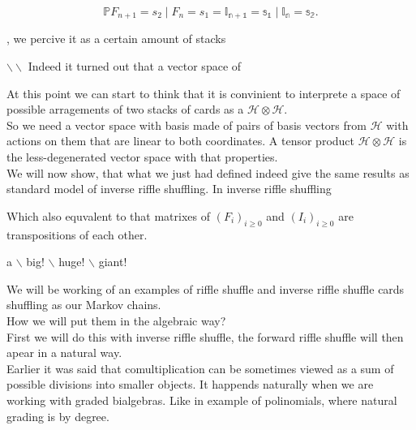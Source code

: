 \documentclass[a4paper]{article}
\begin{document}
\begin{equation*}
\mathbb{P}{F_{n+1} = s_2 \mid F_n = s_1 } = \mathbb{I_{n+1} = s_1 \mid I_n = s_2}.
\end{equation*} 

, we percive it as a certain 
amount of stacks 

$\backslash\backslash$ 
Indeed it turned out that a vector space of

At this point we can start to think that it is convinient to interprete a space of possible arragements 
of two stacks of cards as a $\mathcal{H} \otimes \mathcal{H}$. \\[4pt]

So we need a vector space with basis made of pairs of basis vectors from $\mathcal{H}$ with actions on them 
that are linear to both coordinates. A tensor product $\mathcal{H} \otimes \mathcal{H}$ 
is the less-degenerated vector space with that properties.\\[4pt]

We will now show, that what we just had defined indeed give the same results as standard model of inverse 
riffle shuffling.
In inverse riffle shuffling  

Which also equvalent to that matrixes of $(F_i)_{i \geq 0}$ and $(I_i)_{i \geq 0}$ are transpositions of 
each other.

a $\backslash$ big! $\backslash$ huge! $\backslash$ giant!

We will be working of an examples of riffle shuffle and inverse riffle shuffle cards shuffling as 
our Markov chains. \\
How we will put them in the algebraic way? \\
First we will do this with inverse riffle shuffle, the forward riffle shuffle will then apear in a natural 
way. \\

 
Earlier it was said that comultiplication can be sometimes viewed as a sum 
of possible divisions into smaller objects. It happends naturally when we are working with graded bialgebras. 
Like in example of polinomials, where natural grading is by degree. \\
\end{document}
